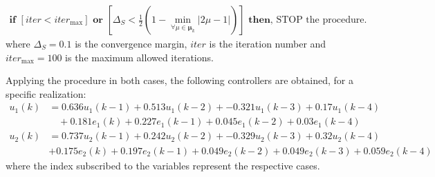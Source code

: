 \begin{exmp}
\begin{align}
  \textbf{if } \left[iter<iter_{\max}\right] \textbf{ or } \left[\Delta_S < \frac{1}{2} \left(1-\min_{\forall \mu \in \bm{\mu}_k}{ \left| 2\mu -1 \right| }\right)\right] \textbf{ then} \text{, STOP the procedure.}
\label{eq:crit.par}
\end{align}
where $\Delta_S = 0.1$ is the convergence margin, $iter$ is the iteration number and $iter_{\max} = 100$ is the maximum allowed iterations.


Applying the procedure in both cases, the following controllers are obtained, for a specific realization:
\begin{align}
  \label{eq:ex51CasesAB}
  u_1(k) &= 0.636{u}_1(k-1) + 0.513{u}_1(k-2) + -0.321{u}_1(k-3) + 0.17{u}_1(k-4) \nonumber\\
      &\quad+ 0.181{e}_1(k) + 0.227{e}_1(k-1) + 0.045{e}_1(k-2) + 0.03{e}_1(k-4) \\
  u_2(k) &= 0.737{u}_2(k-1) + 0.242{u}_2(k-2) + -0.329{u}_2(k-3) + 0.32{u}_2(k-4) \nonumber\\
         &+ 0.175{e}_2(k) + 0.197{e}_2(k-1) + 0.049{e}_2(k-2) + 0.049{e}_2(k-3) + 0.059{e}_2(k-4)
\end{align}
where the index subscribed to the variables represent the respective cases.


\end{exmp}
